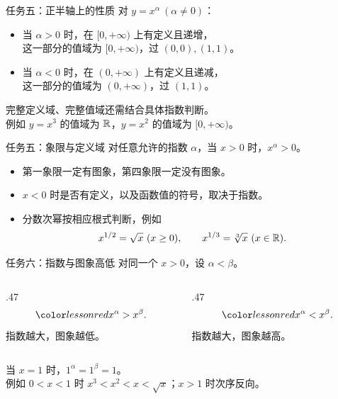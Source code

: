 \documentclass[aspectratio=169,10pt]{beamer}
\begin{document}
\begin{frame}[t]{任务五：正半轴上的性质}
 对 $y=x^\alpha\ (\alpha\ne0)$：
 \begin{itemize}
  \item 当 $\alpha>0$ 时，在 $[0,+\infty)$ 上有定义且递增，\\
        这一部分的值域为 $[0,+\infty)$，过 $(0,0),(1,1)$。
  \item 当 $\alpha<0$ 时，在 $(0,+\infty)$ 上有定义且递减，\\
        这一部分的值域为 $(0,+\infty)$，过 $(1,1)$。
 \end{itemize}
 \pause
 \gap
 完整定义域、完整值域还需结合具体指数判断。\\
 例如 $y=x^3$ 的值域为 $\mathbb R$，$y=x^2$ 的值域为 $[0,+\infty)$。
\end{frame}

\begin{frame}[t]{任务五：象限与定义域}
 对任意允许的指数 $\alpha$，当 $x>0$ 时，$x^\alpha>0$。
 \pause
 \begin{itemize}
  \item 第一象限一定有图象，第四象限一定没有图象。
  \item $x<0$ 时是否有定义，以及函数值的符号，取决于指数。
  \item 分数次幂按相应根式判断，例如
   \[x^{1/2}=\sqrt x\ (x\ge0),\qquad x^{1/3}=\sqrt[3]x\ (x\in\mathbb R).\]
 \end{itemize}
\end{frame}

\begin{frame}[t]{任务六：指数与图象高低}
 对同一个 $x>0$，设 $\alpha<\beta$。
 \pause
 \begin{columns}[T,onlytextwidth]
  \begin{column}{.47\textwidth}
   \[\ans{x^\alpha>x^\beta}.\]
   指数越大，图象越低。
  \end{column}
  \begin{column}{.47\textwidth}
   \[\ans{x^\alpha<x^\beta}.\]
   指数越大，图象越高。
  \end{column}
 \end{columns}
 \gap
 当 $x=1$ 时，$1^\alpha=1^\beta=1$。\\
 例如 $0<x<1$ 时 $x^3<x^2<x<\sqrt x$；$x>1$ 时次序反向。
\end{frame}
\end{document}
